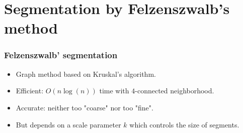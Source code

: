 \documentclass{beamer}
\begin{document}
\section{Segmentation by Felzenszwalb's method}

\begin{frame}
\frametitle{Felzenszwalb' segmentation \cite{felzenszwalb2004efficient}}

\begin{itemize}
\item Graph method based on Kruskal's algorithm.
\item Efficient: $O(n\log(n))$ time with $4$-connected neighborhood.
\item Accurate: neither too "coarse" nor too "fine".
\item But depends on a scale parameter $k$ which controls the size of segments.
\end{itemize}


\end{frame}
\end{document}
